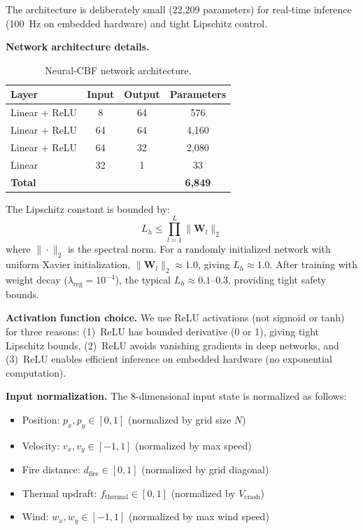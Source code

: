 \documentclass[12pt,a4paper]{article}
\DeclareRobustCommand{\mat}[1]{\bm{#1}}
\begin{document}
The architecture is deliberately small (22,209 parameters) for real-time inference (100~Hz on embedded hardware) and tight Lipschitz control.

\textbf{Network architecture details.}
\begin{table}[t]
\centering
\caption{Neural-CBF network architecture.}
\label{tab:cbf_arch}
\begin{tabular}{lccc}
\toprule
\textbf{Layer} & \textbf{Input} & \textbf{Output} & \textbf{Parameters} \\
\midrule
Linear + ReLU & 8 & 64 & 576 \\
Linear + ReLU & 64 & 64 & 4,160 \\
Linear + ReLU & 64 & 32 & 2,080 \\
Linear & 32 & 1 & 33 \\
\midrule
\textbf{Total} & & & \textbf{6,849} \\
\bottomrule
\end{tabular}
\end{table}

The Lipschitz constant is bounded by:
\begin{equation}
    L_h \leq \prod_{l=1}^{L} \|\mat{W}_l\|_2
\end{equation}
where $\|\cdot\|_2$ is the spectral norm. For a randomly initialized network with uniform Xavier initialization, $\|\mat{W}_l\|_2 \approx 1.0$, giving $L_h \approx 1.0$. After training with weight decay ($\lambda_{\text{reg}} = 10^{-4}$), the typical $L_h \approx 0.1$--$0.3$, providing tight safety bounds.

\textbf{Activation function choice.} We use ReLU activations (not sigmoid or tanh) for three reasons: (1)~ReLU has bounded derivative (0 or 1), giving tight Lipschitz bounds, (2)~ReLU avoids vanishing gradients in deep networks, and (3)~ReLU enables efficient inference on embedded hardware (no exponential computation).

\textbf{Input normalization.} The 8-dimensional input state is normalized as follows:
\begin{itemize}[leftmargin=*]
    \item Position: $p_x, p_y \in [0, 1]$ (normalized by grid size $N$)
    \item Velocity: $v_x, v_y \in [-1, 1]$ (normalized by max speed)
    \item Fire distance: $d_{\text{fire}} \in [0, 1]$ (normalized by grid diagonal)
    \item Thermal updraft: $f_{\text{thermal}} \in [0, 1]$ (normalized by $V_{\text{crash}}$)
    \item Wind: $w_x, w_y \in [-1, 1]$ (normalized by max wind speed)
\end{itemize}
\end{document}
